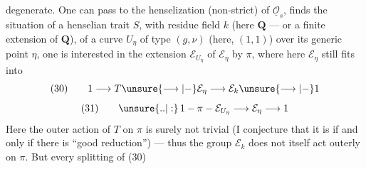 degenerate. One can pass  to
the henselization (non-strict) of $\underline{\mathcal O}_s$, 
finds the situation of a henselian trait
$S$, with residue field $k$ (here $\mathbf Q$ --- or a
finite extension of $\mathbf Q$), of a
curve $U_\eta$ of type $(g,\nu)$ (here, $(1,1)$)
over its generic point $\eta$, one is interested
in the extension $\mathcal E_{U_\eta}$ of $\mathcal E_\eta$ by $\pi$,
where here $\mathcal E_\eta$ still fits into
\[
(30)\qquad 1\longrightarrow T\unsure{\longrightarrow|-}\mathcal E_\eta\longrightarrow\mathcal E_k\unsure{\longrightarrow|-}1
\]
\[
(31)\qquad \unsure{..|:}\,1-\pi-\mathcal E_{U_\eta}\longrightarrow\mathcal E_\eta\longrightarrow1
\]
Here the outer action of $T$ on
$\pi$ is  surely not trivial (I
conjecture that it is if and only if there
is ``good reduction'') --- thus the group
$\mathcal E_k$ does not itself act outerly
on $\pi$. But every splitting of (30)
